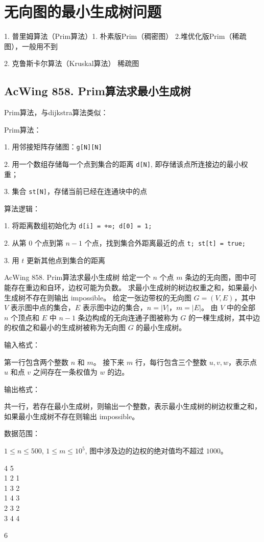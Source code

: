 \section{无向图的最小生成树问题}

1. 普里姆算法（Prim算法）1. 朴素版Prim（稠密图） 2.堆优化版Prim（稀疏图），一般用不到

2. 克鲁斯卡尔算法（Kruskal算法） 稀疏图

\subsection{AcWing 858. Prim算法求最小生成树}
Prim算法，与dijkstra算法类似：

Prim算法：

1. 用邻接矩阵存储图：\lstinline{g[N][N]}

2. 用一个数组存储每一个点到集合的距离 \lstinline{d[N]}, 即存储该点所连接边的最小权重；

3. 集合 \lstinline{st[N]}，存储当前已经在连通块中的点

算法逻辑：

1. 将距离数组初始化为 \lstinline{d[i] = +∞; d[0] = 1;}

2. 从第 $0$ 个点到第 $n - 1$ 个点，找到集合外距离最近的点 \lstinline{t; st[t] = true;}

3. 用 $t$ 更新其他点到集合的距离

\begin{titledbox}{AcWing 858. Prim算法求最小生成树}
    给定一个 $n$ 个点 $m$ 条边的无向图，图中可能存在重边和自环，边权可能为负数。 求最小生成树的树边权重之和，如果最小生成树不存在则输出 impossible。 给定一张边带权的无向图 $G=(V, E)$，其中 $V$ 表示图中点的集合，$E$ 表示图中边的集合，$n=|V|$，$m=|E|$。 由 $V$ 中的全部 $n$ 个顶点和 $E$ 中 $n-1$ 条边构成的无向连通子图被称为 $G$ 的一棵生成树，其中边的权值之和最小的生成树被称为无向图 $G$ 的最小生成树。

    输入格式：

    第一行包含两个整数 $n$ 和 $m$。 接下来 $m$ 行，每行包含三个整数 $u,v,w$，表示点 $u$ 和点 $v$ 之间存在一条权值为 $w$ 的边。

    输出格式：

    共一行，若存在最小生成树，则输出一个整数，表示最小生成树的树边权重之和，如果最小生成树不存在则输出 impossible。

    数据范围：

    $1 \le n \le 500$, $1 \le m \le 10^5$, 图中涉及边的边权的绝对值均不超过 $1000$。

    \begin{inputblock}
        4 5 \\
        1 2 1 \\
        1 3 2 \\
        1 4 3 \\
        2 3 2 \\
        3 4 4
    \end{inputblock}
    \begin{outputblock}
        6
    \end{outputblock}
\end{titledbox}

